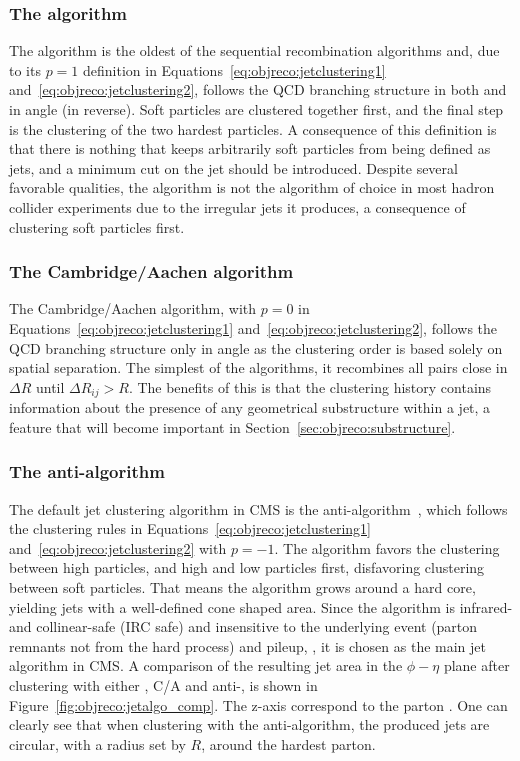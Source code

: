 \subsubsection{The \kt algorithm}
The \kt algorithm is the oldest of the sequential recombination algorithms and, due to its $p=1$ definition in Equations~\ref{eq:objreco:jetclustering1} and~\ref{eq:objreco:jetclustering2}, follows the QCD branching structure in both \PT and in angle (in reverse). Soft particles are clustered together first, and the final step is the clustering of the two hardest particles. A consequence of this definition is that there is nothing that keeps arbitrarily soft particles from being defined as jets, and a minimum cut on the jet \PT should be introduced.
Despite several favorable qualities, the \kt algorithm is not the algorithm of choice in most hadron collider experiments due to the irregular jets it produces, a consequence of clustering soft particles first.

\subsubsection{The Cambridge/Aachen algorithm}
The Cambridge/Aachen algorithm, with $p=0$ in Equations~\ref{eq:objreco:jetclustering1} and~\ref{eq:objreco:jetclustering2}, follows the QCD branching structure only in angle as the clustering order is based solely on spatial separation. The simplest of the algorithms, it recombines all pairs close in $\Delta R$ until $\Delta R_{ij} > R$.
The benefits of this is that the clustering history contains information about the presence of any geometrical substructure within a jet, a feature that will become important in Section~\ref{sec:objreco:substructure}.

\subsubsection{The anti-\kt algorithm}
The default jet clustering algorithm in CMS is the anti-\kt algorithm~\cite{Cacciari:2008gp}, which follows the clustering rules in Equations~\ref{eq:objreco:jetclustering1} and~\ref{eq:objreco:jetclustering2} with $p=-1$. The algorithm favors the clustering between high \PT particles, and high and low \PT particles first, disfavoring clustering between soft particles. That means the algorithm grows around a hard core, yielding jets with a well-defined cone shaped area. Since the algorithm is infrared- and collinear-safe (IRC safe) and insensitive to the underlying event (parton remnants not from the hard process) and pileup, , it is chosen as the main jet algorithm in CMS. A comparison of the resulting jet area in the $\phi-\eta$ plane after clustering with either \kt, C/A and anti-\kt, is shown in Figure~\ref{fig:objreco:jetalgo_comp}. The z-axis correspond to the parton \PT. One can clearly see that when clustering with the anti-\kt algorithm, the produced jets are circular, with a radius set by $R$, around the hardest parton.

